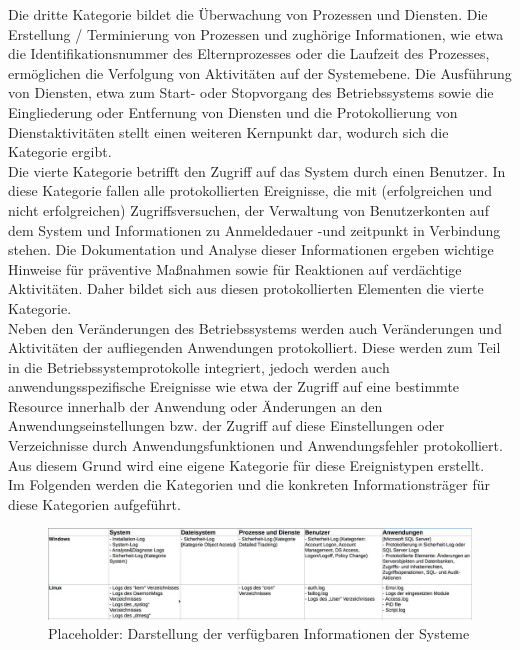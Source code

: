 Die dritte Kategorie bildet die Überwachung von Prozessen und Diensten. Die Erstellung / Terminierung von Prozessen und zughörige Informationen, wie etwa die Identifikationsnummer des Elternprozesses oder die Laufzeit des Prozesses, ermöglichen die Verfolgung von Aktivitäten auf der Systemebene. Die Ausführung von Diensten, etwa zum Start- oder Stopvorgang des Betriebssystems sowie die Eingliederung oder Entfernung von Diensten und die Protokollierung von Dienstaktivitäten stellt einen weiteren Kernpunkt dar, wodurch sich die Kategorie ergibt. \\

Die vierte Kategorie betrifft den Zugriff auf das System durch einen Benutzer. In diese Kategorie fallen alle protokollierten Ereignisse, die mit (erfolgreichen und nicht erfolgreichen) Zugriffsversuchen, der Verwaltung von Benutzerkonten auf dem System und Informationen zu Anmeldedauer -und zeitpunkt in Verbindung stehen. 
Die Dokumentation und Analyse dieser Informationen ergeben wichtige Hinweise für präventive Maßnahmen sowie für Reaktionen auf verdächtige Aktivitäten. Daher bildet sich aus diesen protokollierten Elementen die vierte Kategorie. \\

Neben den Veränderungen des Betriebssystems werden auch Veränderungen und Aktivitäten der aufliegenden Anwendungen protokolliert. Diese werden zum Teil in die Betriebssystemprotokolle integriert, jedoch werden auch anwendungsspezifische Ereignisse wie etwa der Zugriff auf eine bestimmte Resource innerhalb der Anwendung oder Änderungen an den Anwendungseinstellungen bzw. der Zugriff auf diese Einstellungen oder Verzeichnisse durch Anwendungsfunktionen und Anwendungsfehler protokolliert. Aus diesem Grund wird eine eigene Kategorie für diese Ereignistypen erstellt. \\

Im Folgenden werden die Kategorien und die konkreten Informationsträger für diese Kategorien aufgeführt.

\begin{figure}[h]
\centering
\includegraphics[width=125mm]{Zeichnungen/UnternehmenssystemeInformationen.jpg}
\caption{Placeholder: Darstellung der verfügbaren Informationen der Systeme}
\label{fig:EnterpriseSystemInformation}
\end{figure}

